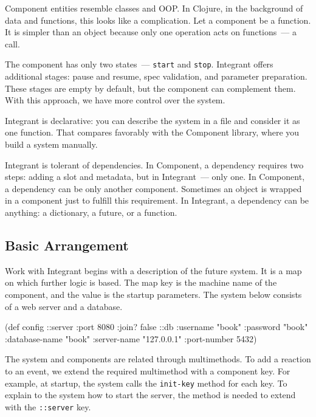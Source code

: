 
Component entities resemble classes and OOP. In Clojure, in the background of data and functions, this looks like a complication. Let a component be a function. It is simpler than an object because only one operation acts on functions~--- a call.

The component has only two states~--- \verb|start| and \verb|stop|. Integrant offers additional stages: pause and resume, spec validation, and parameter preparation. These stages are empty by default, but the component can complement them. With this approach, we have more control over the system.


Integrant is declarative: you can describe the system in a file and consider it as one function. That compares favorably with the Component library, where you build a system manually.

Integrant is tolerant of dependencies. In Component, a dependency requires two steps: adding a slot and metadata, but in Integrant~--- only one. In Component, a dependency can be only another component. Sometimes an object is wrapped in a component just to fulfill this requirement. In Integrant, a dependency can be anything: a dictionary, a future, or a function.

\subsection{Basic Arrangement}

Work with Integrant begins with a description of the future system. It is a map on which further logic is based. The map key is the machine name of the component, and the value is the startup parameters. The system below consists of a web server and a database.

\begin{english}
  \begin{clojure}
(def config
  {::server {:port 8080 :join? false}
   ::db {:username      "book"
         :password      "book"
         :database-name "book"
         :server-name   "127.0.0.1"
         :port-number   5432}})
  \end{clojure}
\end{english}


The system and components are related through multimethods. To add a reaction to an event, we extend the required multimethod with a component key. For example, at startup, the system calls the \verb|init-key| method for each key. To explain to the system how to start the server, the method is needed to extend with the \verb|::server| key.

